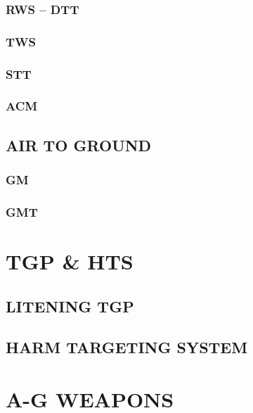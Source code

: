 \documentclass[fontInter]{TechCheck}
\begin{document}
	\subsection{RWS -- DTT}

	\subsection{TWS}

	\subsection{STT}

	\subsection{ACM}

	\clearpage 

	\section{AIR TO GROUND}

	\subsection{GM}

	\subsection{GMT}

	\cleardoublepage

	\chapter{TGP \& HTS}
	\minitoc
	\cleardoublepage

	\section{LITENING TGP}

	\clearpage 

	\section{HARM TARGETING SYSTEM}

	\cleardoublepage

	\chapter{A-G WEAPONS}
	\minitoc
	\cleardoublepage
\end{document}
